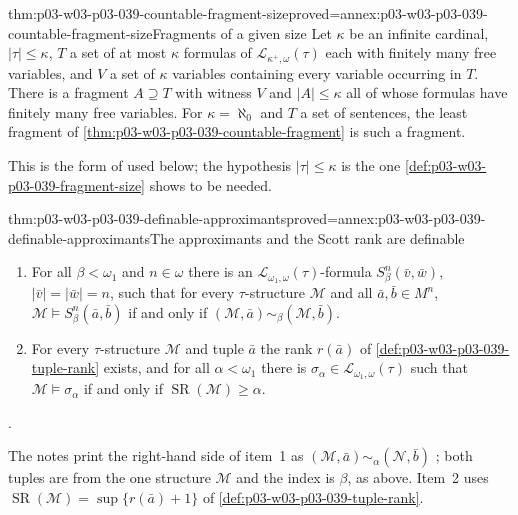 \begin{hblemma}{thm:p03-w03-p03-039-countable-fragment-size}{proved=annex:p03-w03-p03-039-countable-fragment-size}{Fragments of a given size}
Let \(\kappa\) be an infinite cardinal, \(\lvert\tau\rvert\le\kappa\), \(T\) a
set of at most \(\kappa\) formulas of \(\mathcal L_{\kappa^+,\omega}(\tau)\)
each with finitely many free variables, and \(V\) a set of \(\kappa\)
variables containing every variable occurring in \(T\). There is a fragment
\(A\supseteq T\) with witness \(V\) and \(\lvert A\rvert\le\kappa\) all of
whose formulas have finitely many free variables. For \(\kappa=\aleph_0\) and
\(T\) a set of sentences, the least fragment of
\cref{thm:p03-w03-p03-039-countable-fragment} is such a fragment.
\end{hblemma}

This is the form of \cite[Exs.~1.19 and~1.20, p.~9]{Marker2014InfinitaryNotes}
used below; the hypothesis \(\lvert\tau\rvert\le\kappa\) is the one
\cref{def:p03-w03-p03-039-fragment-size} shows to be needed.

\begin{hbtheorem}{thm:p03-w03-p03-039-definable-approximants}{proved=annex:p03-w03-p03-039-definable-approximants}{The approximants and the Scott rank are definable}
\begin{enumerate}
\item For all \(\beta<\omega_1\) and \(n\in\omega\) there is an
      \(\mathcal L_{\omega_1,\omega}(\tau)\)-formula \(S^n_\beta(\bar v,\bar w)\),
      \(\lvert\bar v\rvert=\lvert\bar w\rvert=n\), such that for every
      \(\tau\)-structure \(\mathcal M\) and all \(\bar a,\bar b\in M^n\),
      \(\mathcal M\models S^n_\beta(\bar a,\bar b)\) if and only if
      \((\mathcal M,\bar a)\sim_\beta(\mathcal M,\bar b)\).
\item For every \(\tau\)-structure \(\mathcal M\) and tuple \(\bar a\) the rank
      \(r(\bar a)\) of \cref{def:p03-w03-p03-039-tuple-rank} exists, and for
      all \(\alpha<\omega_1\) there is \(\sigma_\alpha\in\mathcal L_{\omega_1,\omega}(\tau)\)
      such that \(\mathcal M\models\sigma_\alpha\) if and only if
      \(\operatorname{SR}(\mathcal M)\ge\alpha\).
\end{enumerate}
\cite[Ex.~2.21, p.~19]{Marker2014InfinitaryNotes}.
\end{hbtheorem}

The notes print the right-hand side of item~1 as
\((\mathcal M,\bar a)\sim_\alpha(\mathcal N,\bar b)\)
\cite[Ex.~2.21(a), p.~19]{Marker2014InfinitaryNotes}; both tuples are from
the one structure \(\mathcal M\) and the index is \(\beta\), as above. Item~2
uses \(\operatorname{SR}(\mathcal M)=\sup\{r(\bar a)+1\}\) of
\cref{def:p03-w03-p03-039-tuple-rank}.

